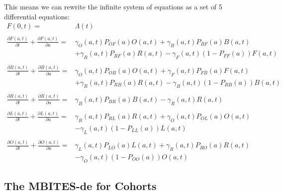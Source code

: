 \documentclass{article}
\begin{document}
This means we can rewrite the infinite system of equations as a
set of 5 differential equations: 
%
\begin{equation}\begin{array}{rl}
F(0,t) =& \Lambda(t) \\ 
%
&\\
\frac{\partial F(a,t)}{\partial t} + \frac{\partial F(a,t)}{\partial a} =& 
\gamma_O(a,t) P_{OF}(a) O(a,t) 
+ \gamma_B(a,t) P_{BF}(a) B(a,t) \\&
 + \gamma_R(a,t) P_{RF}(a) R(a,t)
- \gamma_F(a,t) (1-P_{FF}(a)) F(a,t) \\
%
%
&\\
\frac{\partial B(a,t)}{\partial t} + \frac{\partial B(a,t)}{\partial a} =&  \gamma_O(a,t) P_{OB}(a) O(a,t) + \gamma_F(a,t) P_{FB}(a) F(a,t) \\ & 
+ \gamma_R(a,t) P_{RB}(a) R(a,t) 
- \gamma_B(a,t) (1-P_{BB}(a)) B(a,t)\\
%
&\\
\frac{\partial R(a,t)}{\partial t} + \frac{\partial R(a,t)}{\partial a} =&  \gamma_B(a,t) P_{BR}(a) B(a,t) - \gamma_R(a,t) R(a,t)\\ 
%
&\\
\frac{\partial L(a,t)}{\partial t} + \frac{\partial L(a,t)}{\partial a} =& \gamma_R(a,t) P_{RL}(a) R(a,t) + 
\gamma_O(a,t) P_{OL}(a) O(a,t) \\&
- \gamma_L(a,t) (1-P_{LL}(a)) L(a,t)
\\ 
%
&\\
\frac{\partial O(a,t)}{\partial t} + \frac{\partial O(a,t)}{\partial a} =& \gamma_L(a,t) P_{LO}(a) L(a,t) 
+ \gamma_R(a,t) P_{RO}(a) R(a,t)  
\\&
- \gamma_O(a,t)(1-P_{OO}(a)) O(a,t)

%
\end{array}\end{equation}


\subsection{The MBITES-de for Cohorts}
\end{document}
